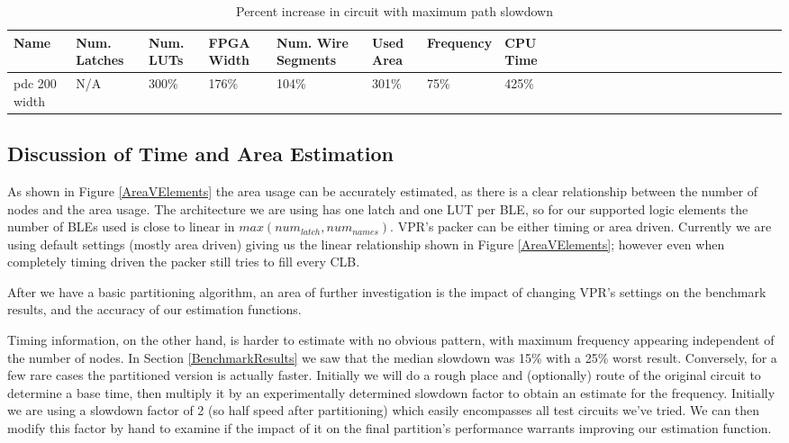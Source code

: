 \documentclass[12pt,final,oneside]{memoir} %
\begin{document}
\begin{table}
    \begin{adjustwidth}{-1cm}{-1.1cm}
        \begin{tabularx}{1.1\textwidth}{XXXXXXXXXXXXXXXXXXXXXXXXXX}
           \toprule
            Name & Num. Latches & Num. \acp{LUT} & FPGA Width & Num. Wire Segments & Used Area & Frequency & CPU Time\\
            \midrule
pdc 200 width   & N/A   & 300\% & 176\% & 104\% & 301\% &  75\% & 425\%\\
          \bottomrule
        \end{tabularx}
        \caption{Percent increase in circuit with maximum path slowdown}
        \label{timing}
    \end{adjustwidth}
\end{table}
\subsection{Discussion of Time and Area Estimation}
As shown in Figure \ref{AreaVElements} the area usage can be accurately estimated, as there is a clear relationship between the number of nodes and the area usage. The architecture we are using has one latch and one \ac{LUT} per \ac{BLE}, so for our supported logic elements the number of \acp{BLE} used is close to linear in $max(num_{latch}, num_{names})$. \ac{VPR}'s packer can be either timing or area driven. Currently we are using default settings (mostly area driven) giving us the linear relationship shown in Figure \ref{AreaVElements}; however even when completely timing driven the packer still tries to fill every \ac{CLB}\cite{AAPackThesis}.

After we have a basic partitioning algorithm, an area of further investigation is the impact of changing \ac{VPR}'s settings on the benchmark results, and the accuracy of our estimation functions.

Timing information, on the other hand, is harder to estimate with no obvious pattern, with maximum frequency appearing independent of the number of nodes. In Section \ref{BenchmarkResults} we saw that the median slowdown was 15\% with a 25\% worst result. Conversely, for a few rare cases the partitioned version is actually faster. Initially we will do a rough place and (optionally) route of the original circuit to determine a base time, then multiply it by an experimentally determined slowdown factor to obtain an estimate for the frequency. Initially we are using a slowdown factor of 2 (so half speed after partitioning) which easily encompasses all test circuits we've tried. We can then modify this factor by hand to examine if the impact of it on the final partition's performance warrants improving our estimation function.
\end{document}
